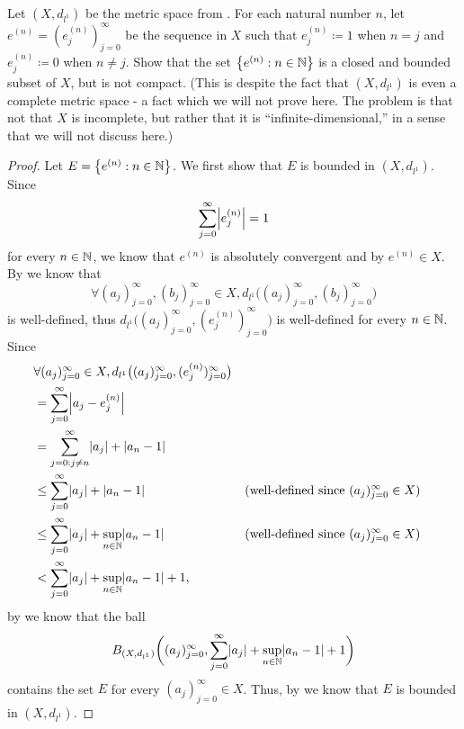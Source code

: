 \begin{ex}\label{ii:ex:1.5.8}
  Let \((X, d_{l^1})\) be the metric space from .
  For each natural number \(n\), let \(e^{(n)} = (e_j^{(n)})_{j = 0}^\infty\) be the sequence in \(X\) such that \(e_j^{(n)} \coloneqq 1\) when \(n = j\) and \(e_j^{(n)} \coloneqq 0\) when \(n \neq j\).
  Show that the set \(\left\lbrace e^{(n)} : n \in \mathbb{N}\right\rbrace\) is a closed and bounded subset of \(X\), but is not compact.
  (This is despite the fact that \((X, d_{l^1})\) is even a complete metric space
  - a fact which we will not prove here.
  The problem is that not that \(X\) is incomplete, but rather that it is ``infinite-dimensional,'' in a sense that we will not discuss here.)
\end{ex}

\begin{proof}
  Let \(E = \left\lbrace e^{(n)} : n \in \mathbb{N}\right\rbrace\).
  We first show that \(E\) is bounded in \((X, d_{l^1})\).
  Since
  \[
    \sum_{j = 0}^\infty \abs{e_j^{(n)}} = 1
  \]
  for every \(n \in \mathbb{N}\), we know that \(e^{(n)}\) is absolutely convergent and by  \(e^{(n)} \in X\).
  By  we know that
  \[
    \forall (a_j)_{j = 0}^\infty, (b_j)_{j = 0}^\infty \in X, d_{l^1}\big((a_j)_{j = 0}^\infty, (b_j)_{j = 0}^\infty\big)
  \]
  is well-defined, thus \(d_{l^1}\big((a_j)_{j = 0}^\infty, (e_j^{(n)})_{j = 0}^\infty\big)\) is well-defined for every \(n \in \mathbb{N}\).
  Since
  \begin{align*}
     & \forall (a_j)_{j = 0}^\infty \in X, d_{l^1}\big((a_j)_{j = 0}^\infty, (e_j^{(n)})_{j = 0}^\infty\big)                                                                 \\
     & = \sum_{j = 0}^\infty \abs{a_j - e_j^{(n)}}                                                                                                                           \\
     & = \sum_{j = 0 : j \neq n}^\infty \abs{a_j} + \abs{a_n - 1}                                                                                                            \\
     & \leq \sum_{j = 0}^\infty \abs{a_j} + \abs{a_n - 1}                                                    &  & \text{(well-defined since \((a_j)_{j = 0}^\infty \in X\))} \\
     & \leq \sum_{j = 0}^\infty \abs{a_j} + \sup_{n \in \N}\abs{a_n - 1}                                     &  & \text{(well-defined since \((a_j)_{j = 0}^\infty \in X\))} \\
     & < \sum_{j = 0}^\infty \abs{a_j} + \sup_{n \in \N}\abs{a_n - 1} + 1,
  \end{align*}
  by  we know that the ball
  \[
    B_{(X, d_{l^1})}\bigg((a_j)_{j = 0}^\infty, \sum_{j = 0}^\infty \abs{a_j} + \sup_{n \in \N}\abs{a_n - 1} + 1\bigg)
  \]
  contains the set \(E\) for every \((a_j)_{j = 0}^\infty \in X\).
  Thus, by  we know that \(E\) is bounded in \((X, d_{l^1})\).


\end{proof}
